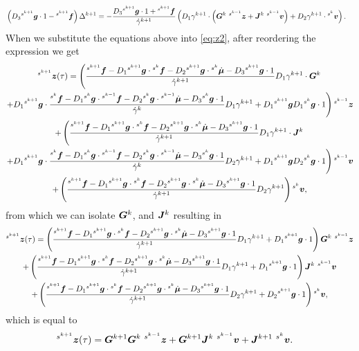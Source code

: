\documentclass[../DC2017114Bouma.tex]{subfiles}
\begin{document}
\begin{align}
&\left(D_3\ls^{s^{k+1}}\gb\cdot 1 - \ls^{s^{k+1}}\fb\right)\Delta^{k+1} = -\frac{D_3\ls^{s^{k+1}}\gb\cdot 1+\ls^{s^{k+1}}\fb}{\dot{\gamma}^{k+1}}\left(D_1\gamma^{k+1}\cdot\left(\Gb^{k}\ \ls^{s^{k-1}}\zb + \Jb^{k}\ \ls^{s^{k-1}}\vb\right) + D_2\gamma^{k+1}\cdot\ls^{s^{k}}\vb\right).
\end{align}
When we substitute the equations above into \eqref{eq:z2}, after reordering the expression we get
\begin{multline}
\ls^{s^{k+1}}\zb(\tau) = \left(\frac{\ls^{s^{k+1}}\fb - D_1\ls^{s^{k+1}}\gb\cdot\ls^{s^{k}}\fb - D_2\ls^{s^{k+1}}\gb\cdot\ls^{s^{k}}\dot{\mub} - D_3\ls^{s^{k+1}}\gb\cdot 1}{\dot{\gamma}^{k+1}}D_1\gamma^{k+1}\cdot\Gb^{k}\right.\\
\left. + D_1\ls^{s^{k+1}}\gb\cdot\frac{\ls^{s^{k}}\fb - D_1\ls^{s^{k}}\gb\cdot\ls^{s^{k-1}}\fb - D_2\ls^{s^{k}}\gb\cdot\ls^{s^{k-1}}\dot{\mub} - D_3\ls^{s^{k}}\gb\cdot 1}{\dot{\gamma}^{k}}D_1\gamma^{k+1} + D_1\ls^{s^{k+1}}\gb D_1\ls^{s^{k}}\gb\cdot 1\right)\ls^{s^{k-1}}\zb\\
+ \left(\frac{\ls^{s^{k+1}}\fb-D_1\ls^{s^{k+1}}\gb\cdot\ls^{s^{k}}\fb -D_2\ls^{s^{k+1}}\gb\cdot\ls^{s^{k}}\dot{\mub} - D_3\ls^{s^{k+1}}\gb\cdot 1}{\dot{\gamma}^{k+1}}D_1\gamma^{k+1}\cdot\Jb^{k}\right.\\
\left. + D_1\ls^{s^{k+1}}\gb\cdot\frac{\ls^{s^{k}}\fb-D_1\ls^{s^{k}}\gb\cdot\ls^{s^{k-1}}\fb-D_2\ls^{s^{k}}\gb\cdot\ls^{s^{k-1}}\dot{\mub}-D_3\ls^{s^{k}}\gb\cdot 1}{\dot{\gamma}^{k}}D_2\gamma^{k+1} + D_1\ls^{s^{k+1}}\gb D_2\ls^{s^{k}}\gb\cdot 1 \right)\ls^{s^{k-1}}\vb\\
+ \left(\frac{\ls^{s^{k+1}}\fb-D_1\ls^{s^{k+1}}\gb\cdot\ls^{s^{k}}\fb - D_2\ls^{s^{k+1}}\gb\cdot\ls^{s^{k}}\dot{\mub} - D_3\ls^{s^{k+1}}\gb\cdot 1}{\dot{\gamma}^{k+1}}D_2\gamma^{k+1}\right)\ls^{s^{k}}\vb,
\end{multline}
from which we can isolate $\Gb^{k}$, and $\Jb^{k}$ resulting in
\begin{multline}
\ls^{s^{k+1}}\zb(\tau) = \left(\frac{\ls^{s^{k+1}}\fb - D_1\ls^{s^{k+1}}\gb\cdot\ls^{s^{k}}\fb  - D_2\ls^{s^{k+1}}\gb\cdot\ls^{s^{k}}\dot{\mub} - D_3\ls^{s^{k+1}}\gb\cdot 1}{\dot{\gamma}^{k+1}}D_1\gamma^{k+1} + D_1\ls^{s^{k+1}}\gb\cdot 1\right)\Gb^{k}\ \ls^{s^{k-1}}\zb\\
+ \left(\frac{\ls^{s^{k+1}}\fb - D_1\ls^{s^{k+1}}\gb\cdot\ls^{s^{k}}\fb - D_2\ls^{s^{k+1}}\gb\cdot\ls^{s^{k}}\dot{\mub} - D_3\ls^{s^{k+1}}\gb\cdot 1}{\dot{\gamma}^{k+1}}D_1\gamma^{k+1} + D_1\ls^{s^{k+1}}\gb\cdot 1\right)\Jb^{k}\ \ls^{s^{k-1}}\vb \\
+ \left(\frac{\ls^{s^{k+1}}\fb-D_1\ls^{s^{k+1}}\gb\cdot\ls^{s^{k}}\fb - D_2\ls^{s^{k+1}}\gb\cdot\ls^{s^{k}}\dot{\mub} - D_3\ls^{s^{k+1}}\gb\cdot 1}{\dot{\gamma}^{k+1}}D_2\gamma^{k+1} + D_2\ls^{s^{k+1}}\gb\cdot 1\right)\ls^{s^{k}}\vb,
\end{multline}
which is equal to
\begin{align}
&\ls^{s^{k+1}}\zb(\tau) = \Gb^{k+1}\Gb^k\ \ls^{s^{k-1}}\zb + \Gb^{k+1}\Jb^k\ \ls^{s^{k-1}}\vb + \Jb^{k+1}\ \ls^{s^{k}}\vb.\label{eq:zkplusfinal}
\end{align}
\end{document}
